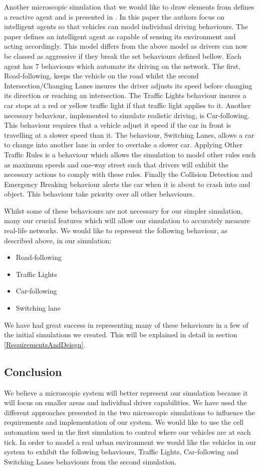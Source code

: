 \documentclass{article}
\begin{document}
	Another microscopic simulation that we would like to draw elements from defines a reactive agent and is presented in \cite{ehlert2001microscopic}. In this paper the authors focus on intelligent agents so that vehicles can model individual driving behaviours. The paper defines an intelligent agent as capable of sensing its environment and acting accordingly. This model differs from the above model as drivers can now be classed as aggressive if they break the set behaviours defined bellow. Each agent has 7 behaviours which automate its driving on the network. The first, Road-following, keeps the vehicle on the road whilst the second Intersection/Changing Lanes insures the driver adjusts its speed before changing its direction or reaching an intersection. The Traffic Lights behaviour insures a car stops at a red or yellow traffic light if that traffic light applies to it.  Another necessary behaviour, implemented to simulate realistic driving, is Car-following. This behaviour requires that a vehicle adjust it speed if the car in front is travelling at a slower speed than it. The behaviour, Switching Lanes, allows a car to change into another lane in order to overtake a slower car. Applying Other Traffic Rules is a behaviour which allows the simulation to model other rules such as maximum speeds and one-way street such that drivers will exhibit the necessary actions to comply with these rules. Finally the Collision Detection and Emergency Breaking behaviour alerts the car when it is about to crash into and object. This behaviour take priority over all other behaviours. 
	
	Whilst some of these behaviours are not necessary for our simpler simulation, many our crucial features which will allow our simulation to accurately measure real-life networks. We would like to represent the following behaviour, as described above, in our simulation: 
	\begin{itemize}
		\item Road-following
		\item Traffic Lights
		\item Car-following
		\item Switching lane
	\end{itemize}
	 We have had great success in representing many of these behaviours in a few of the initial simulations we created. This will be explained in detail in section \ref{RequirementsAndDeisgn}. 
	
	
	\subsection{Conclusion}
	We believe a microscopic system will better represent our simulation because it will focus on smaller areas and individual driver capabilities. 
	We have used the different approaches presented in the two microscopic simulations to influence the requirements and implementation of our system. We would like to use the cell automation used in the first simulation to control where our vehicles are at each tick. In order to model a real urban environment we would like the vehicles in our system to exhibit the following behaviours, Traffic Lights, Car-following and Switching Lanes behaviours from the second simulation.
	
\end{document}

